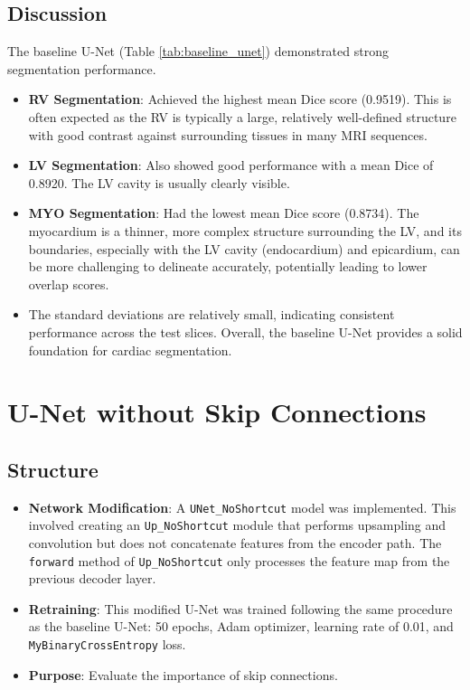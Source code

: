 \documentclass{article}
\begin{document}
\subsection{Discussion}
The baseline U-Net (Table \ref{tab:baseline_unet}) demonstrated strong segmentation performance.
\begin{itemize}
  \item \textbf{RV Segmentation}: Achieved the highest mean Dice score (0.9519). This is often expected as the RV is typically a large, relatively well-defined structure with good contrast against surrounding tissues in many MRI sequences.
  \item \textbf{LV Segmentation}: Also showed good performance with a mean Dice of 0.8920. The LV cavity is usually clearly visible.
  \item \textbf{MYO Segmentation}: Had the lowest mean Dice score (0.8734). The myocardium is a thinner, more complex structure surrounding the LV, and its boundaries, especially with the LV cavity (endocardium) and epicardium, can be more challenging to delineate accurately, potentially leading to lower overlap scores.
  \item The standard deviations are relatively small, indicating consistent performance across the test slices. Overall, the baseline U-Net provides a solid foundation for cardiac segmentation.
\end{itemize}


\section{U-Net without Skip Connections}

\subsection{Structure}
\begin{itemize}
  \item \textbf{Network Modification}: A \texttt{UNet\_NoShortcut} model was implemented. This involved creating an
        \texttt{Up\_NoShortcut} module that performs upsampling and convolution but does not concatenate features from the encoder
        path. The \texttt{forward} method of \texttt{Up\_NoShortcut} only processes the feature map from the previous decoder layer.
  \item \textbf{Retraining}: This modified U-Net was trained following the same procedure as the baseline U-Net: 50 epochs, Adam optimizer, learning rate of 0.01, and \texttt{MyBinaryCrossEntropy} loss.
  \item \textbf{Purpose}: Evaluate the importance of skip connections.
\end{itemize}
\end{document}
